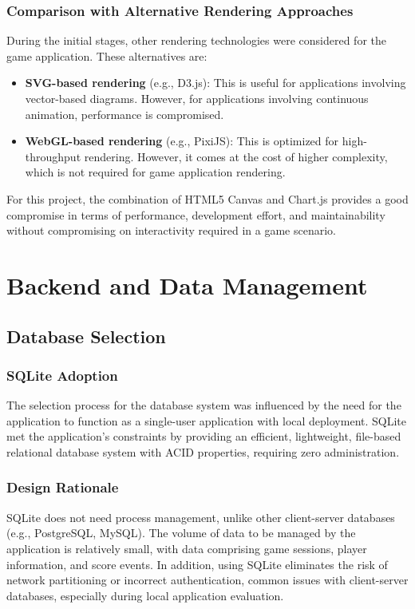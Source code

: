\subsubsection{Comparison with Alternative Rendering Approaches}
During the initial stages, other rendering technologies were considered for the game application. These alternatives are:
\begin{itemize}
	\item \textbf{SVG-based rendering} (e.g., D3.js): This is useful for applications involving vector-based diagrams. However, for applications involving continuous animation, performance is compromised.
	\item \textbf{WebGL-based rendering} (e.g., PixiJS): This is optimized for high-throughput rendering. However, it comes at the cost of higher complexity, which is not required for game application rendering.

\end{itemize}

For this project, the combination of HTML5 Canvas and Chart.js provides a good compromise in terms of performance, development effort, and maintainability without compromising on interactivity required in a game scenario.

\section{Backend and Data Management}

\subsection{Database Selection}

\subsubsection{SQLite Adoption}
The selection process for the database system was influenced by the need for the application to function as a single-user application with local deployment. SQLite met the application's constraints by providing an efficient, lightweight, file-based relational database system with ACID properties, requiring zero administration.

\subsubsection{Design Rationale}
SQLite does not need process management, unlike other client-server databases (e.g., PostgreSQL, MySQL). The volume of data to be managed by the application is relatively small, with data comprising game sessions, player information, and score events. In addition, using SQLite eliminates the risk of network partitioning or incorrect authentication, common issues with client-server databases, especially during local application evaluation.

